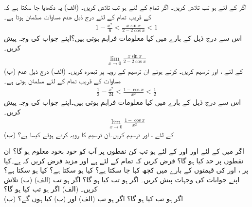 اگر  کے لئے  ہو تب  تلاش کریں۔
اگر تمام  کے لئے  ہو تب  تلاش کریں۔
(الف) \quad
یہ دکھایا جا سکتا ہے کہ  کے قریب تمام  کے لئے درج ذیل عدم مساوات مطمئن ہوتا ہے۔
\begin{align*}
1-\frac{x^2}{6}<\frac{x\sin x}{2-2\cos x}<1
\end{align*}
اس سے درج ذیل کے بارے میں کیا معلومات فراہم ہوتی ہیں؟اپنے جواب کی وجہ پیش کریں۔
\begin{align*}
\lim_{x\to 0} \frac{x\sin x}{2-2\cos x}
\end{align*}
(ب)\quad
{} کے لئے ،  اور  ترسیم کریں۔  کرتے ہوئے ان  ترسیم کے رویہ پر تبصرہ کریں۔
(الف) \quad
درج ذیل عدم مساوات  کے قریب تمام  کے لئے مطمئن ہوتی ہے۔
\begin{align*}
\frac{1}{2}-\frac{x^2}{24}<\frac{1-\cos x}{x^2}<\frac{1}{2}
\end{align*} 
اس سے درج ذیل کے بارے میں کیا معلومات فراہم ہوتی ہیں۔اپنے جواب کی وجہ پیش کریں۔
\begin{align*}
\lim_{x\to 0}\frac{1-\cos x}{x^2}
\end{align*}
(ب)\quad
{} کے لئے ،  اور  ترسیم کریں۔ان ترسیم کا رویہ   کرتے ہوئے کیسا ہے؟


اگر  میں  کے لئے  اور  اور  کے لئے  ہو تب کن نقطوں  پر آپ کو  خود بخود معلوم ہو گا؟ ان نقطوں پر حد کیا ہو گا؟
فرض کریں کہ تمام  کے لئے  ہے اور مزید فرض کریں کہ  ہے۔کیا  پر ،  اور  کی قیمتوں کے بارے میں کچھ کہا جا سکتا ہے؟ کیا  ہو سکتا ہے؟ کیا  ہو سکتا ہے؟ اپنے جوابات کی وجہات پیش کریں۔
اگر  ہو تب  کیا ہو گا؟
اگر  ہو تب (الف)  (ب)  تلاش کریں۔
(الف) \quad
اگر  ہو تب  کیا ہو گا؟\\
(ب) \quad
اگر  ہو تب  کیا ہو گا؟
اگر  ہو تب (الف)  اور (ب)  کیا ہوں گے؟

